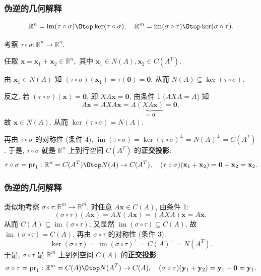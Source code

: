 \begin{frame}
\frametitle{伪逆的几何解释}

\[
\mathbb{R}^n = \operatorname{im}(\tau\circ\sigma) \Otop \ker(\tau\circ\sigma), \quad \mathbb{R}^m = \operatorname{im}(\sigma\circ\tau) \Otop \ker(\sigma\circ\tau).
\]

{\color{red}} 考察 $\tau\circ\sigma: \mathbb{R}^n \to \mathbb{R}^n$.

\pause
\vspace{0.5em}

任取 $\mathbf{x} = \mathbf{x}_1 + \mathbf{x}_2 \in \mathbb{R}^n,$ 其中 $\mathbf{x}_1 \in N(A), \mathbf{x}_2 \in C(A^T)$.

由 $\mathbf{x}_1 \in N(A)$ 知 $(\tau\circ\sigma)(\mathbf{x}_1) = \tau(\mathbf{0}) = \mathbf{0}$, 从而 $N(A) \subseteq \ker(\tau\circ\sigma)$.

\pause
\vspace{0.5em}

反之, 若 $(\tau\circ\sigma)(\mathbf{x}) = \mathbf{0}$, 即 $XA\mathbf{x} = \mathbf{0}$, 由条件 1 ($AXA = A$) 知
\[
A\mathbf{x} = AXA\mathbf{x} = A\underbrace{(XA\mathbf{x})}_{=\,\mathbf{0}} = \mathbf{0},
\]
故 $\mathbf{x} \in N(A)$. 从而 $\ker(\tau\circ\sigma) = N(A)$.

\pause
\vspace{0.5em}

再由 $\tau\circ\sigma$ 的对称性 (条件 4), $\operatorname{im}(\tau\circ\sigma) = \ker(\tau\circ\sigma)^\perp = N(A)^\perp = C(A^T)$. 于是, $\tau\circ\sigma$ 就是 $\mathbb{R}^n$ 上到行空间 $C(A^T)$ 的\textbf{正交投影}:
\[
\tau\circ\sigma = \operatorname{pr}_1: \mathbb{R}^n = C(A^T) \Otop N(A) \to C(A^T), \quad (\tau\circ\sigma)(\mathbf{x}_1 + \mathbf{x}_2) = \mathbf{0} + \mathbf{x}_2 = \mathbf{x}_2.
\]

\end{frame}


\begin{frame}
\frametitle{伪逆的几何解释}

{\color{red}} 类似地考察 $\sigma\circ\tau: \mathbb{R}^m \to \mathbb{R}^m$. 对任意 $A\mathbf{x} \in C(A)$, 由条件 1:
\[
(\sigma\circ\tau)(A\mathbf{x}) = AX(A\mathbf{x}) = (AXA)\mathbf{x} = A\mathbf{x},
\]
从而 $C(A) \subseteq \operatorname{im}(\sigma\circ\tau)$; 又显然 $\operatorname{im}(\sigma\circ\tau) \subseteq C(A)$, 故 $\operatorname{im}(\sigma\circ\tau) = C(A)$. 再由 $\sigma\circ\tau$ 的对称性 (条件 3):
\[
\ker(\sigma\circ\tau) = \operatorname{im}(\sigma\circ\tau)^\perp = C(A)^\perp = N(A^T).
\]
于是, $\sigma\circ\tau$ 是 $\mathbb{R}^m$ 上到列空间 $C(A)$ 的\textbf{正交投影}:
\[
\sigma\circ\tau = \operatorname{pr}_1: \mathbb{R}^m = C(A) \Otop N(A^T) \to C(A), \quad (\sigma\circ\tau)(\mathbf{y}_1 + \mathbf{y}_2) = \mathbf{y}_1 + \mathbf{0} = \mathbf{y}_1.
\]

\end{frame}

